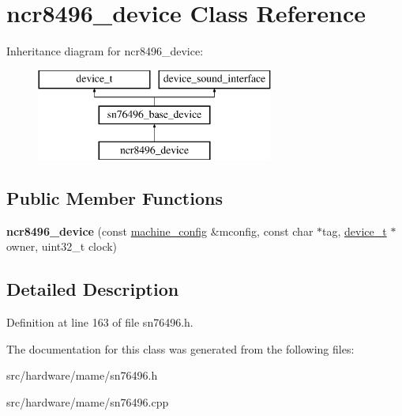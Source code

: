 \hypertarget{classncr8496__device}{\section{ncr8496\-\_\-device Class Reference}
\label{classncr8496__device}
}
Inheritance diagram for ncr8496\-\_\-device\-:\begin{figure}[H]
\begin{center}
\leavevmode
\includegraphics[height=3.000000cm]{classncr8496__device}
\end{center}
\end{figure}
\subsection*{Public Member Functions}
\begin{DoxyCompactItemize}
\item 
\hypertarget{classncr8496__device_a39aeaf1c1703749ebae17fb5e3736a71}{{\bfseries ncr8496\-\_\-device} (const \hyperlink{structmachine__config}{machine\-\_\-config} \&mconfig, const char $\ast$tag, \hyperlink{classdevice__t}{device\-\_\-t} $\ast$owner, uint32\-\_\-t clock)}\label{classncr8496__device_a39aeaf1c1703749ebae17fb5e3736a71}

\end{DoxyCompactItemize}


\subsection{Detailed Description}


Definition at line 163 of file sn76496.\-h.



The documentation for this class was generated from the following files\-:\begin{DoxyCompactItemize}
\item 
src/hardware/mame/sn76496.\-h\item 
src/hardware/mame/sn76496.\-cpp\end{DoxyCompactItemize}
